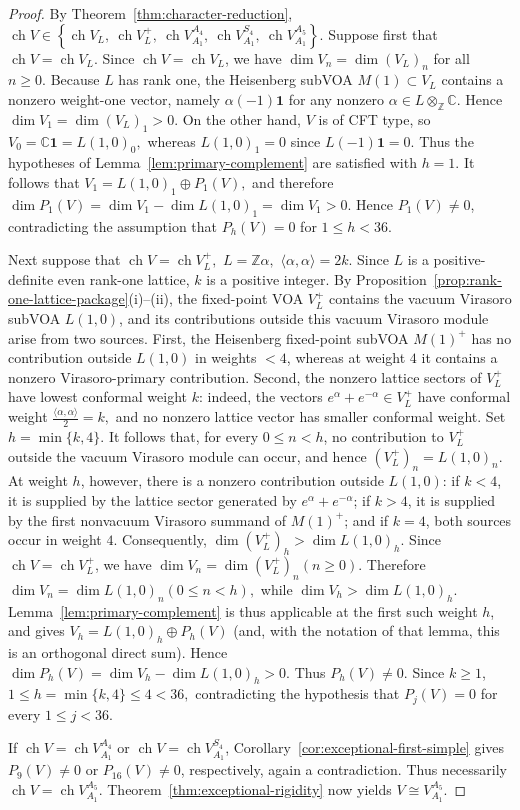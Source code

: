\documentclass[10pt,a4paper]{amsart}
\numberwithin{equation}{section} \newtheorem{thm}{Theorem}[section] \newtheorem{lem}[thm]{Lemma} \newtheorem{ex}[thm]{Example} \newtheorem{prop}[thm]{Proposition} \newtheorem{cor}[thm]{Corollary} \newtheorem{defi}[thm]{Definition} \newtheorem{rmk}[thm]{Remark} \newtheorem{notation}[thm]{Notation}
\newcommand{\ch}{\operatorname{ch}}
\begin{document}
\begin{proof}
By Theorem~\ref{thm:character-reduction}, \(\ch V\in \left\{ \ch V_L,\ \ch V_L^+,\ \ch V_{A_1}^{A_4},\ \ch V_{A_1}^{S_4},\ \ch V_{A_1}^{A_5} \right\}\). Suppose first that \(\ch V=\ch V_L\). Since \(\ch V=\ch V_L\), we have $ \dim V_n=\dim (V_L)_n $ for all $n\ge0. $ Because \(L\) has rank one, the Heisenberg subVOA \(M(1)\subset V_L\) contains a nonzero weight-one vector, namely \(\alpha(-1)\mathbf 1\) for any nonzero \(\alpha\in L\otimes_{\mathbb Z}\mathbb C\). Hence $ \dim V_1=\dim (V_L)_1>0. $ On the other hand, \(V\) is of CFT type, so $ V_0=\mathbb C\mathbf1=L(1,0)_0, $ whereas $ L(1,0)_1=0 $ since \(L(-1)\mathbf1=0\). Thus the hypotheses of Lemma~\ref{lem:primary-complement} are satisfied with \(h=1\). It follows that $ V_1=L(1,0)_1\oplus P_1(V), $ and therefore $ \dim P_1(V) =\dim V_1-\dim L(1,0)_1 =\dim V_1>0. $ Hence \(P_1(V)\ne0\), contradicting the assumption that \(P_h(V)=0\) for \(1\le h<36\).

Next suppose that $ \ch V=\ch V_L^+,$ $L=\mathbb Z\alpha, $ $\langle\alpha,\alpha\rangle=2k. $ Since \(L\) is a positive-definite even rank-one lattice, \(k\) is a positive integer. By Proposition~\ref{prop:rank-one-lattice-package}(i)--(ii), the fixed-point VOA \(V_L^+\) contains the vacuum Virasoro subVOA \(L(1,0)\), and its contributions outside this vacuum Virasoro module arise from two sources. First, the Heisenberg fixed-point subVOA \(M(1)^+\) has no contribution outside \(L(1,0)\) in weights \(<4\), whereas at weight \(4\) it contains a nonzero Virasoro-primary contribution. Second, the nonzero lattice sectors of \(V_L^+\) have lowest conformal weight \(k\): indeed, the vectors $ e^\alpha+e^{-\alpha}\in V_L^+ $ have conformal weight $ \frac{\langle\alpha,\alpha\rangle}{2}=k, $ and no nonzero lattice vector has smaller conformal weight. Set $ h=\min\{k,4\}. $ It follows that, for every \(0\le n<h\), no contribution to \(V_L^+\) outside the vacuum Virasoro module can occur, and hence $ (V_L^+)_n=L(1,0)_n. $ At weight \(h\), however, there is a nonzero contribution outside \(L(1,0)\): if \(k<4\), it is supplied by the lattice sector generated by \(e^\alpha+e^{-\alpha}\); if \(k>4\), it is supplied by the first nonvacuum Virasoro summand of \(M(1)^+\); and if \(k=4\), both sources occur in weight \(4\). Consequently, $ \dim (V_L^+)_h>\dim L(1,0)_h. $ Since \(\ch V=\ch V_L^+\), we have $ \dim V_n=\dim (V_L^+)_n (n\ge0). $ Therefore $ \dim V_n=\dim L(1,0)_n (0\le n<h), $ while $ \dim V_h>\dim L(1,0)_h. $ Lemma~\ref{lem:primary-complement} is thus applicable at the first such weight \(h\), and gives $ V_h=L(1,0)_h\oplus P_h(V) $ (and, with the notation of that lemma, this is an orthogonal direct sum). Hence $ \dim P_h(V) = \dim V_h-\dim L(1,0)_h >0. $ Thus \(P_h(V)\ne0\). Since \(k\ge1\), $ 1\le h=\min\{k,4\}\le4<36, $ contradicting the hypothesis that \(P_j(V)=0\) for every \(1\le j<36\).

If \(\ch V=\ch V_{A_1}^{A_4}\) or \(\ch V=\ch V_{A_1}^{S_4}\), Corollary~\ref{cor:exceptional-first-simple} gives \(P_9(V)\ne0\) or \(P_{16}(V)\ne0\), respectively, again a contradiction. Thus necessarily \(\ch V=\ch V_{A_1}^{A_5}.\) Theorem~\ref{thm:exceptional-rigidity} now yields \(V\cong V_{A_1}^{A_5}\).
\end{proof}
\end{document}
